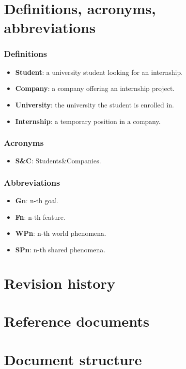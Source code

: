 \begin{enumerate}[label=\textbf{SP\arabic* -}]
\end{enumerate}

\section{Definitions, acronyms, abbreviations}
\subsubsection{Definitions}
\begin{itemize}
    \item \textbf{Student}: a university student looking for an internship.
    \item \textbf{Company}: a company offering an internship project.
    \item \textbf{University}: the university the student is enrolled in.
    \item \textbf{Internship}: a temporary position in a company.
\end{itemize}

\subsubsection{Acronyms}
\begin{itemize}
    \item \textbf{S\&C}: Students\&Companies.
\end{itemize}

\subsubsection{Abbreviations}
\begin{itemize}
    \item \textbf{Gn}: n-th goal.
    \item \textbf{Fn}: n-th feature.
    \item \textbf{WPn}: n-th world phenomena.
    \item \textbf{SPn}: n-th shared phenomena.
\end{itemize}

\section{Revision history}

\section{Reference documents}

\section{Document structure}
